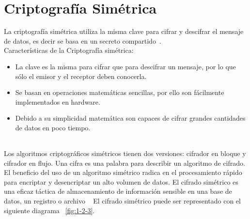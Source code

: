 \section{Criptografía Simétrica}
La criptografía simétrica utiliza la misma clave para cifrar y descifrar el mensaje de datos, es decir se basa en un secreto compartido~\cite{criptosimetrica}. \\ Características de la Criptografía simétrica: \begin{itemize}
	\item La clave es la misma para cifrar que para descifrar un mensaje, por lo que sólo el emisor y el receptor deben conocerla.
	\item Se basan en operaciones matemáticas sencillas, por ello son fácilmente implementados en hardware.
	\item Debido a su simplicidad matemática son capaces de cifrar grandes cantidades de datos en poco tiempo.
			       \end{itemize} ~\cite{sime} \\
Los algoritmos criptográficos simétricos tienen dos versiones: cifrador en bloque y cifrador en flujo. Una cifra es una palabra para describir un algoritmo de cifrado. El beneficio del uso de un algoritmo simétrico radica en el procesamiento rápido
para encriptar y desencriptar un alto volumen de datos. El cifrado simétrico es una eficaz táctica de almacenamiento de información
sensible en una base de datos, un registro o archivo ~\cite{sime} El cifrado simétrico puede ser representado con el siguiente diagrama ~\ref{fig:1-2-3}.

